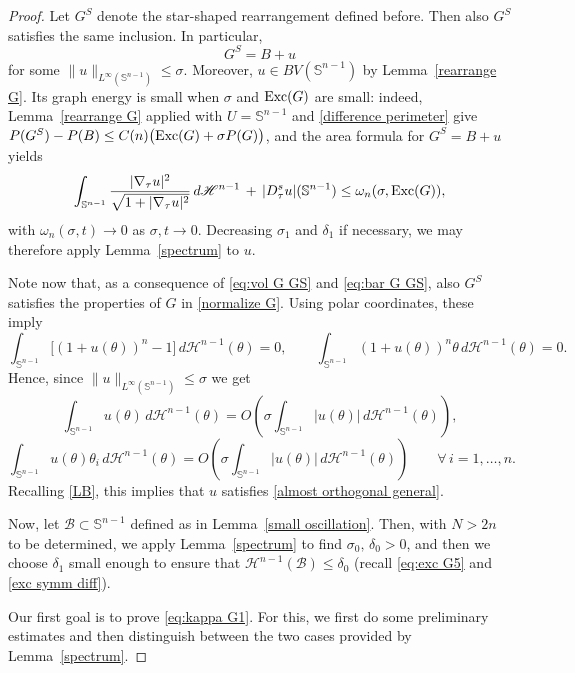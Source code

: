 \documentclass[reqno,11pt]{amsart}
\def\dz{\delta}
\def\sz{\sigma}
\numberwithin{equation}{section}
\theoremstyle{remark}
\begin{document}
\begin{proof}
Let $G^S$ denote the star-shaped rearrangement defined before. Then also $G^S$ satisfies the same inclusion. In particular,
$$G^S=B+u$$ 
for some $\|u\|_{L^\infty(\mathbb S^{n-1})}\le \sz. $ Moreover, $u\in BV(\mathbb S^{n-1})$ by Lemma~\ref{rearrange G}. Its graph energy is small when $\sigma$ and ${\rm Exc}(G)$ are small: indeed, Lemma~\ref{rearrange G} applied with $U=\mathbb S^{n-1}$ and \eqref{difference perimeter} give $P(G^S)-P(B)\le C(n)\big({\rm Exc}(G)+\sigma P(G)\big)$, and the area formula for $G^S=B+u$ yields
\[
\int_{\mathbb S^{n-1}}\frac{|\nabla_\tau u|^2}{\sqrt{1+|\nabla_\tau u|^2}}\,d\mathscr H^{n-1}
\,+\,|D^s_\tau u|(\mathbb S^{n-1})
\le \omega_n(\sigma,{\rm Exc}(G)),
\]
with $\omega_n(\sigma,t)\to0$ as $\sigma,t\to0$. Decreasing $\sigma_1$ and $\delta_1$ if necessary, we may therefore apply Lemma~\ref{spectrum} to $u$.

Note now that, as a consequence of
\eqref{eq:vol G GS} and \eqref{eq:bar G GS}, also $G^S$ satisfies the properties of $G$ in \eqref{normalize G}.
Using polar coordinates, these imply
$$
\int_{\mathbb S^{n-1}}\big[(1+u(\theta))^n-1\big]\,d\mathscr H^{n-1}(\theta)=0, \qquad \int_{\mathbb S^{n-1}}(1+u(\theta))^n\theta\,d\mathscr H^{n-1}(\theta)=0.
$$
Hence, since $\|u\|_{L^\infty(\mathbb S^{n-1})}\le \sz$ we get 
$$
\int_{\mathbb S^{n-1}}u(\theta)\,d\mathscr H^{n-1}(\theta)=O\left(\sigma \int_{\mathbb S^{n-1}}|u(\theta)|\,d\mathscr H^{n-1}(\theta)\right),$$
$$
\int_{\mathbb S^{n-1}}u(\theta)\theta_i\,d\mathscr H^{n-1}(\theta)=O\left(\sigma \int_{\mathbb S^{n-1}}|u(\theta)|\,d\mathscr H^{n-1}(\theta)\right)\qquad \forall\,i=1,\ldots,n.
$$
Recalling \eqref{LB}, this 
implies that $u$ satisfies \eqref{almost orthogonal general}. 

Now, let $\mathcal B\subset \mathbb S^{n-1}$ defined as in Lemma~\ref{small oscillation}. Then, with $N>2n$ to be determined, we apply Lemma~\ref{spectrum} to find 
$\sz_0,\,\dz_0>0$,
and then we choose $\delta_1$ small enough to ensure that  $\mathscr H^{n-1}(\mathcal B)\leq \delta_0$
(recall \eqref{eq:exc G5} and \eqref{exc symm diff}).

Our first goal is to prove \eqref{eq:kappa G1}. For this, we first do some preliminary estimates and then distinguish between the two cases provided by Lemma~\ref{spectrum}.


\end{proof}
\end{document}
